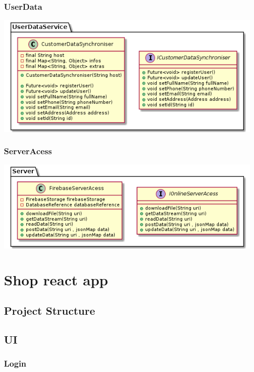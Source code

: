 \documentclass{article}
\begin{document}
 
\subsubsection{UserData}
\includegraphics[scale=0.5]{./out/MobileApp/Infrastructure/UserData/UserData.png}\\


\subsubsection{ServerAcess}
\includegraphics[scale=0.5]{./out/MobileApp/Infrastructure/ServerAcess/ServerAccess.png}\\

\section{Shop react app}

\subsection{Project Structure}

\subsection{UI}

\subsubsection{Login}
\end{document}
